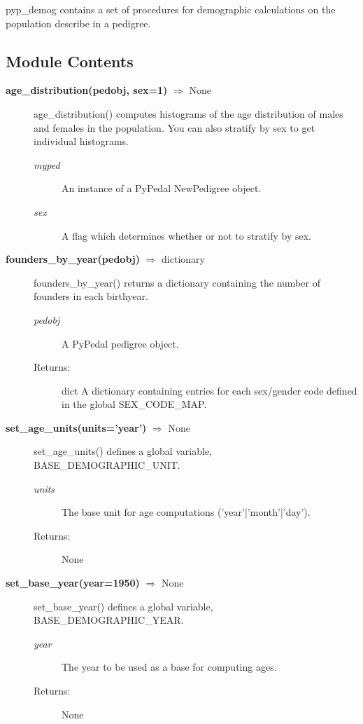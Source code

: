 pyp\_demog contains a set of procedures for demographic calculations on the population describe in a pedigree.
\subsection*{Module Contents}

\begin{description}
\item[\textbf{age\_distribution(pedobj, sex=1)} $\Rightarrow$ None]
age\_distribution() computes histograms of the age distribution of males and females in the population. You can also stratify by sex to get individual histograms.
\begin{description}
\item[\emph{myped}] An instance of a PyPedal NewPedigree object.
\item[\emph{sex}] A flag which determines whether or not to stratify by sex.
\end{description}

\item[\textbf{founders\_by\_year(pedobj)} $\Rightarrow$ dictionary]
founders\_by\_year() returns a dictionary containing the number of founders in each birthyear.
\begin{description}
\item[\emph{pedobj}] A PyPedal pedigree object.
\item[Returns:] dict A dictionary containing entries for each sex/gender code defined in the global SEX\_CODE\_MAP.
\end{description}

\item[\textbf{set\_age\_units(units='year')} $\Rightarrow$ None]
set\_age\_units() defines a global variable, BASE\_DEMOGRAPHIC\_UNIT.
\begin{description}
\item[\emph{units}] The base unit for age computations ('year'|'month'|'day').
\item[Returns:] None
\end{description}

\item[\textbf{set\_base\_year(year=1950)} $\Rightarrow$ None]
set\_base\_year() defines a global variable, BASE\_DEMOGRAPHIC\_YEAR.
\begin{description}
\item[\emph{year}] The year to be used as a base for computing ages.
\item[Returns:] None
\end{description}


\end{description}
